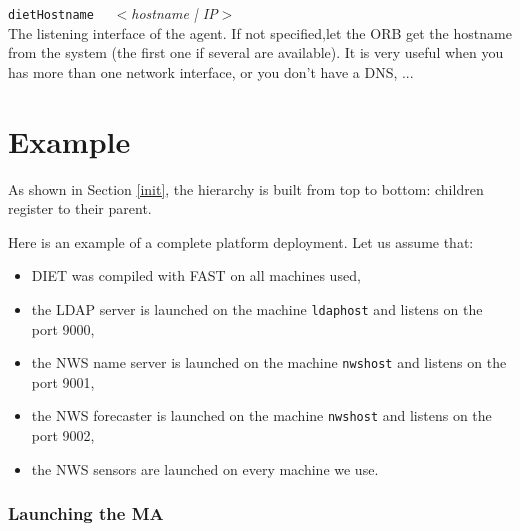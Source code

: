 \noindent
\texttt{dietHostname} \ \ \emph{$<$hostname |  IP$>$}\\
The listening interface of the agent. If not specified,let the ORB get the hostname from the system (the first one if several are available).
It is very useful when you has more than one network interface, or you don't have a DNS, ...

\section{Example}
\label{sec:deploy_ex}

As shown in Section \ref{init}, the hierarchy is built from top to
bottom: children register to their parent.

Here is an example of a complete platform deployment. Let us assume that:

\begin{itemize}
\item DIET was compiled with FAST on all machines used,
\item the LDAP server is launched on the machine \texttt{ldaphost} and listens
  on the port 9000,
\item the NWS name server is launched on the machine \texttt{nwshost} and
  listens on the port 9001,
\item the NWS forecaster is launched on the machine \texttt{nwshost} and
  listens on the port 9002,
\item the NWS sensors are launched on every machine we use.
\end{itemize}


\subsubsection{Launching the MA}

